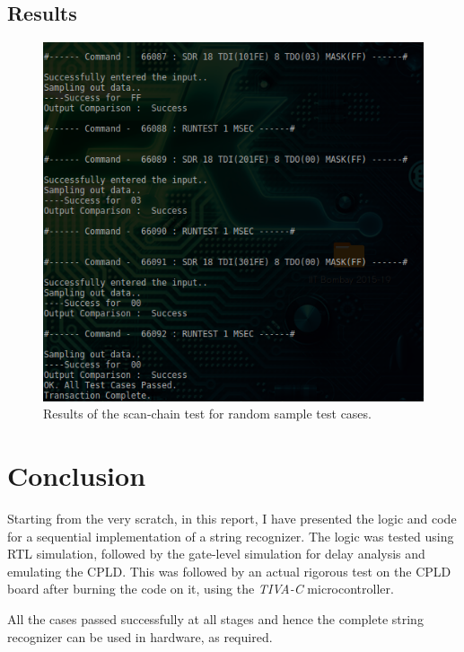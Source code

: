 \documentclass[a4paper, 11pt]{article}
\begin{document}
\subsection*{Results}
\begin{figure}[H]
\centering
\includegraphics[scale=0.66]{Complete_Test}
\caption{Results of the scan-chain test for random sample test cases.}
\end{figure}


\section*{Conclusion}
Starting from the very scratch, in this report, I have presented the logic and code for a sequential implementation of a string recognizer. The logic was tested using RTL simulation, followed by the gate-level simulation for delay analysis and emulating the CPLD. This was followed by an actual rigorous test on the CPLD board after burning the code on it, using the \emph{TIVA-C} microcontroller.
\par
All the cases passed successfully at all stages and hence the complete string recognizer can be used in hardware, as required.
\end{document}
